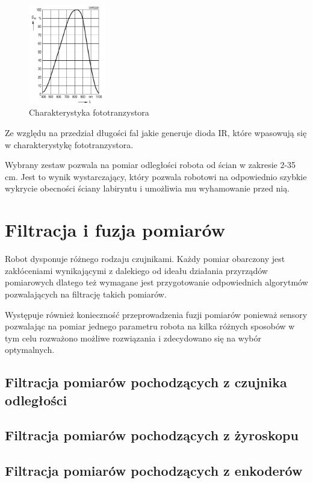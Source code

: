 \documentclass[12pt,a4paper,twoside,openright,fleqn]{mwrep}
\begin{document}
\begin{figure}[h]
\centering
\includegraphics[width=0.3\textwidth]{./images/fototranzystor}
\caption{Charakterystyka fototranzystora}
\label{fototranzystor}
\end{figure}

Ze względu na przedział długości fal jakie generuje dioda IR, które wpasowują się w charakterystykę fototranzystora.
    
Wybrany zestaw pozwala na pomiar odległości robota od ścian w zakresie 2-35 cm. Jest to wynik wystarczający, który pozwala robotowi na odpowiednio szybkie wykrycie obecności ściany labiryntu i umożliwia mu wyhamowanie przed nią. 

\section{Filtracja i fuzja pomiarów} %
Robot dysponuje różnego rodzaju czujnikami. Każdy pomiar obarczony jest zakłóceniami wynikającymi z dalekiego od ideału działania przyrządów pomiarowych dlatego też wymagane jest przygotowanie odpowiednich algorytmów pozwalających na filtrację takich pomiarów.

Występuje również konieczność przeprowadzenia fuzji pomiarów ponieważ sensory pozwalając na pomiar jednego parametru robota na kilka różnych sposobów w tym celu rozważono możliwe rozwiązania i zdecydowano się na wybór optymalnych.


\subsection{Filtracja pomiarów pochodzących z czujnika odległości} 
\subsection{Filtracja pomiarów pochodzących z żyroskopu} 
\subsection{Filtracja pomiarów pochodzących z enkoderów} 
\end{document}
